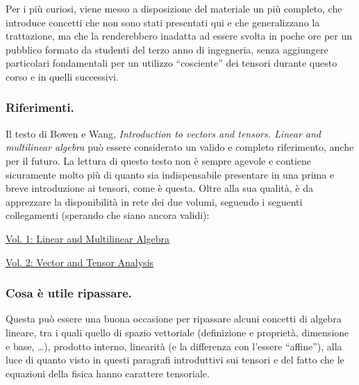 \vspace{10pt}
 \noindent
 Per i più curiosi, viene messo a disposizione del materiale un più completo, che introduce concetti che non sono stati presentati qui e che generalizzano la trattazione, ma che la renderebbero inadatta ad essere svolta in poche ore per un pubblico formato da studenti del terzo anno di ingegneria, senza aggiungere particolari fondamentali per un utilizzo ``cosciente'' dei tensori durante questo corso e in quelli successivi.

 \subsubsection{Riferimenti.}  
 Il testo di Bowen e Wang, \textit{Introduction to vectors and tensors. Linear and multilinear algebra} può essere considerato un valido e completo riferimento, anche per il futuro. La lettura di questo testo non è sempre agevole e contiene sicuramente molto più di quanto sia indispensabile presentare in una prima e breve introduzione ai tensori, come è questa.
 Oltre alla sua qualità, è da apprezzare la disponibilità in rete dei due volumi, seguendo i seguenti collegamenti (sperando che siano ancora validi):
 
 \href{http://oaktrust.library.tamu.edu/bitstream/handle/1969.1/2502/IntroductionToVectorsAndTensorsVol1.pdf}
 {Vol. 1: Linear and Multilinear Algebra}
 
 \href{http://oaktrust.library.tamu.edu/bitstream/handle/1969.1/3609/IntroductionToVectorsAndTensorsVol2.pdf}
 {Vol. 2: Vector and Tensor Analysis}
 
 
 
 \subsubsection{Cosa è utile ripassare.} Questa può essere una buona occasione per ripassare alcuni concetti di algebra lineare, tra i quali quello di spazio vettoriale (definizione e proprietà, dimensione e base, \dots), prodotto interno, linearità (e la differenza con l'essere ``affine''), alla luce di quanto visto in questi paragrafi introduttivi sui tensori e del fatto che le equazioni della fisica hanno carattere tensoriale.




